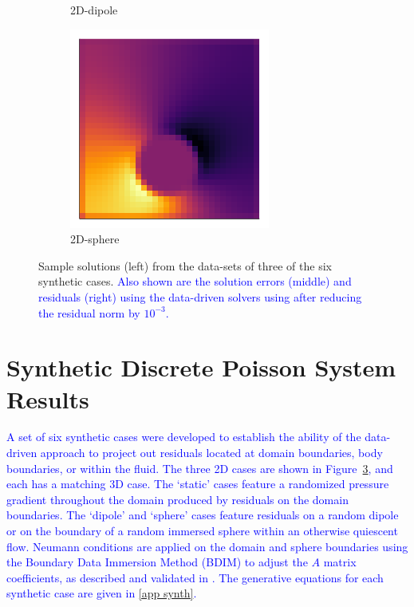 \documentclass[review]{elsarticle}
\begin{document}
\begin{figure}
\begin{subfigure}[b]{0.3\textwidth}
        \caption{2D-dipole}
        \label{fig:2D-mu}
    \end{subfigure}
    \begin{subfigure}[b]{0.3\textwidth}
        \centering
        \includegraphics[width=\textwidth]{figures/2D-sphere.png}
        \caption{2D-sphere}
        \label{fig:2D-sphere}
    \end{subfigure}
    \caption{Sample solutions (left) from the data-sets of three of the six synthetic cases. \textcolor{blue}{Also shown are the solution errors (middle) and residuals (right) using the data-driven solvers using after reducing the residual norm by $10^{-3}$.}}
    \label{fig:synthetic cases}
\end{figure}

\section{Synthetic Discrete Poisson System Results}

\textcolor{blue}{A set of six synthetic cases were developed to establish the ability of the data-driven approach to project out residuals located at domain boundaries, body boundaries, or within the fluid. The three 2D cases are shown in Figure~\ref{fig:synthetic cases}, and each has a matching 3D case. The `static' cases feature a randomized pressure gradient throughout the domain produced by residuals on the domain boundaries. The `dipole' and `sphere' cases feature residuals on a random dipole or on the boundary of a random immersed sphere within an otherwise quiescent flow. Neumann conditions are applied on the domain and sphere boundaries using the Boundary Data Immersion Method (BDIM) to adjust the $A$ matrix coefficients, as described and validated in \cite{maertens2015accurate,Lauber2022}. The  generative equations for each synthetic case are given in \ref{app synth}.}
\end{document}
